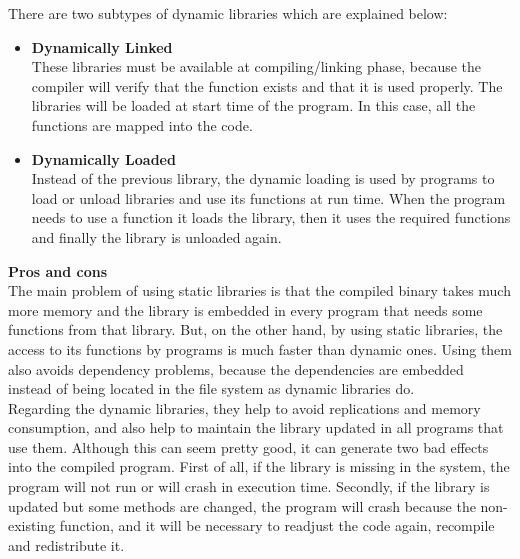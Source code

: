 \begin{itemize}
There are two subtypes of dynamic libraries which are explained below:
  \begin{itemize}
    \item 
    \textbf{Dynamically Linked}
  	\\
  	These libraries must be available at compiling/linking phase, because the compiler will verify that the function exists and that it is used properly. The libraries will be loaded at start time of the program. In this case, all the functions are mapped into the code.
    \item
    \textbf{Dynamically Loaded}
    \\
    Instead of the previous library, the dynamic loading is used by programs to load or unload libraries and use its functions at run time. When the program needs to use a function it loads the library, then it uses the required functions and finally the library is unloaded again.
    \end{itemize}
\end{itemize}

\textbf{Pros and cons}
\\
The main problem of using static libraries is that the compiled binary takes much more memory and the library is embedded in every program that needs some functions from that library. But, on the other hand, by using static libraries, the access to its functions by programs is much faster than dynamic ones. Using them also avoids dependency problems, because the dependencies are embedded instead of being located in the file system as dynamic libraries do.
\\
Regarding the dynamic libraries, they help to avoid replications and memory consumption, and also help to maintain the library updated in all programs that use them. Although this can seem pretty good, it can generate two bad effects into the compiled program. First of all, if the library is missing in the system, the program will not run or will crash in execution time. Secondly, if the library is updated but some methods are changed, the program will crash because the non-existing function, and it will be necessary to readjust the code again, recompile and redistribute it.

